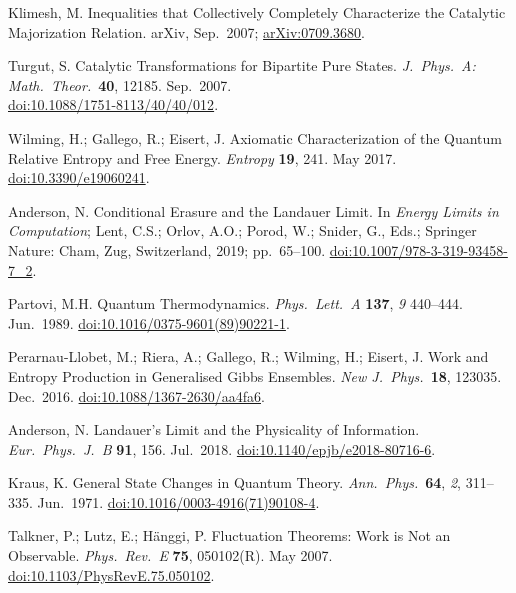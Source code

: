 \documentclass[preprints,article,accept,moreauthors,pdftex]{Definitions/mdpi}
\begin{document}
\begin{thebibliography}{999}
Klimesh, M\@. Inequalities that Collectively Completely Characterize the Catalytic Majorization Relation. arXiv, Sep.\ 2007; \href{https://arxiv.org/abs/0709.3680}{arXiv:0709.3680}.

Turgut, S\@. Catalytic Transformations for Bipartite Pure States. {\em J.\ Phys.\ A: Math.\ Theor.}\ {\bf 40}, 12185. Sep.\ 2007. 
\\[0pt]
\href{https://doi.org/10.1088/1751-8113/40/40/012}{doi:10.1088/1751-8113/40/40/012}.

Wilming, H.; Gallego, R.; Eisert, J\@. Axiomatic Characterization of the Quantum Relative Entropy and Free Energy. {\em Entropy} {\bf 19}, 241. May 2017. \href{https://doi.org/10.3390/e19060241}{doi:10.3390/e19060241}.

Anderson, N\@. Conditional Erasure and the Landauer Limit. In \emph{Energy Limits in Computation}; Lent, C.S.; Orlov, A.O.; Porod, W.; Snider, G., Eds.; Springer Nature: Cham, Zug, Switzerland, 2019; pp.~65--100. \href{https://doi.org/10.1007/978-3-319-93458-7_2}{doi:10.1007/978-3-319-93458-7\_2}.

Partovi, M.H\@. Quantum Thermodynamics. {\em Phys.\ Lett.\ A} {\bf 137}, {\em 9}  440--444. Jun.\ 1989. \href{https://doi.org/10.1016/0375-9601(89)90221-1}{doi:10.1016/0375-9601(89)90221-1}.

Perarnau-Llobet, M.; Riera, A.; Gallego, R.; Wilming, H.; Eisert, J\@. Work and Entropy Production in Generalised Gibbs Ensembles. {\em New J.\ Phys.}\ {\bf 18}, 123035. Dec.\ 2016. \href{https://doi.org/10.1088/1367-2630/aa4fa6}{doi:10.1088/1367-2630/aa4fa6}.

Anderson, N\@. Landauer's Limit and the Physicality of Information. {\em Eur.\ Phys.\ J.\ B} {\bf 91}, 156. Jul.\ 2018. \href{https://doi.org/10.1140/epjb/e2018-80716-6}{doi:10.1140/epjb/e2018-80716-6}.

Kraus, K. General State Changes in Quantum Theory. {\em Ann.\ Phys.}\ {\bf 64}, {\em 2}, 311--335. Jun.\ 1971. \href{https://doi.org/10.1016/0003-4916(71)90108-4}{doi:10.1016/0003-4916(71)90108-4}.

Talkner, P.; Lutz, E.; Hänggi, P\@. Fluctuation Theorems: Work is Not an Observable. {\em Phys.\ Rev.\ E} {\bf 75}, 050102(R). May 2007. \href{https://doi.org/10.1103/PhysRevE.75.050102}{doi:10.1103/PhysRevE.75.050102}.


\end{thebibliography}
\end{document}
